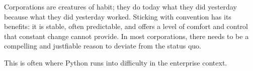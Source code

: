 Corporations are creatures of habit; they do today what they did yesterday because what they did yesterday worked. Sticking with convention has its benefits: it is stable, often predictable, and offers a level of comfort and control that constant change cannot provide. In most corporations, there needs to be a compelling and justfiable reason to deviate from the status quo.

This is often where Python runs into difficulty in the enterprise context.
